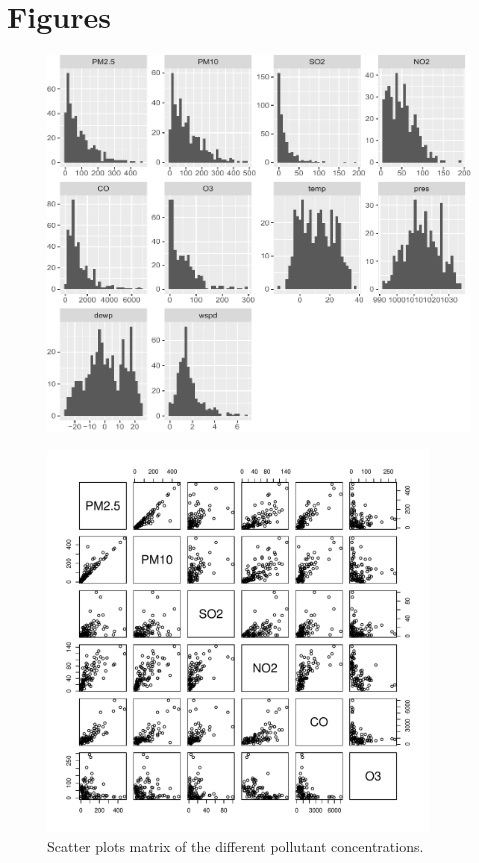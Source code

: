 \documentclass[a4paper, 12pt]{article}
\begin{document}
    \section{Figures}
    \begin{figure}[h]
	    \centering
        \includegraphics[width=0.9\linewidth]{resources/pdf/histograms.pdf}
        \label{fig:histograms}
    \end{figure}
    \begin{figure}[h]
	    \centering
	    \includegraphics[width=0.9\textwidth]{resources/pdf/pairs_pollutants.pdf}
	    \caption{Scatter plots matrix of the different pollutant concentrations.}
	    \label{fig:pairs_pollutants}
	\end{figure}
\end{document}
